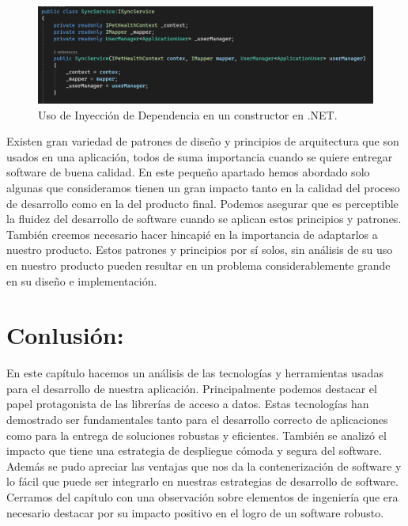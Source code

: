 \begin{figure}[H]
	\centering
	\includegraphics[width = 12cm]{Graphics/dep_inj_example.jpg}
	\caption{Uso de Inyección de Dependencia en un constructor en .NET.}
	\label{fig:di_use_example}
\end{figure}

Existen gran variedad de patrones de diseño y principios de arquitectura que son usados en una aplicación, todos de suma importancia cuando se quiere entregar software de buena calidad. En este pequeño apartado hemos abordado solo algunas que consideramos tienen un gran impacto tanto en la calidad del proceso de desarrollo como en la del producto final. Podemos asegurar que es perceptible la fluidez del desarrollo de software cuando se aplican estos principios y patrones. También creemos necesario hacer hincapié en la importancia de adaptarlos a nuestro producto. Estos patrones y principios por sí solos, sin análisis de su uso en nuestro producto pueden resultar en un problema considerablemente grande en su diseño e implementación.

\section{Conlusión:}
En este capítulo hacemos un análisis de las tecnologías y herramientas usadas para el desarrollo de nuestra aplicación. Principalmente podemos destacar el papel protagonista de las librerías de acceso a datos. Estas tecnologías han demostrado ser fundamentales tanto para el desarrollo correcto de aplicaciones como para la entrega de soluciones robustas y eficientes. También se analizó el impacto que tiene una estrategia de despliegue cómoda y segura del software. Además se pudo apreciar las ventajas que nos da la contenerización de software y lo fácil que puede ser integrarlo en nuestras estrategias de desarrollo de software.  Cerramos del capítulo con una observación sobre elementos de ingeniería que era necesario destacar por su impacto positivo en el logro de un software robusto.
